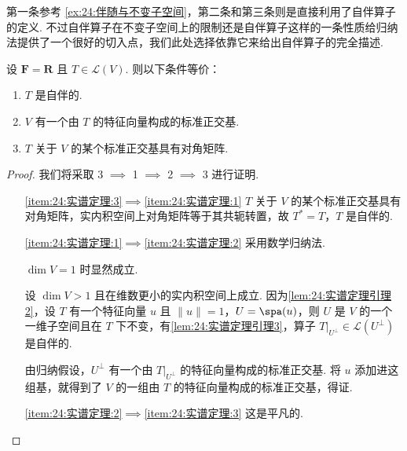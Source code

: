 第一条参考 \autoref{ex:24:伴随与不变子空间}，第二条和第三条则是直接利用了自伴算子的定义. 不过自伴算子在不变子空间上的限制还是自伴算子这样的一条性质给归纳法提供了一个很好的切入点，我们此处选择依靠它来给出自伴算子的完全描述.

\begin{theorem}[实谱定理] \label{thm:24:实谱定理} 
    设 $ \mathbf{F} = \mathbf{R} $ 且 $ T \in \mathcal{L}(V) $. 则以下条件等价：
    \begin{enumerate}
        \item \label{item:24:实谱定理:1}
              $ T $ 是自伴的.

        \item \label{item:24:实谱定理:2}
              $ V $ 有一个由 $ T $ 的特征向量构成的标准正交基.

        \item \label{item:24:实谱定理:3}
              $ T $ 关于 $ V $ 的某个标准正交基具有对角矩阵.
    \end{enumerate}
\end{theorem}

\begin{proof}
    我们将采取 3 $\implies$ 1 $\implies$ 2 $\implies$ 3 进行证明.

    \begin{itemize}
        \item[\ref*{item:24:实谱定理:3}$\implies$\ref*{item:24:实谱定理:1}] $ T $ 关于 $ V $ 的某个标准正交基具有对角矩阵，实内积空间上对角矩阵等于其共轭转置，故 $ T^* = T $，$ T $ 是自伴的.

        \item[\ref*{item:24:实谱定理:1}$\implies$\ref*{item:24:实谱定理:2}] 采用数学归纳法.

            $ \dim V = 1 $ 时显然成立.

            设 $ \dim V > 1 $ 且在维数更小的实内积空间上成立. 因为\autoref{lem:24:实谱定理引理2}，设 $ T $ 有一个特征向量 $ u $ 且 $ \lVert u \rVert = 1 $，$ U = \spa(u) $，则 $ U $ 是 $ V $ 的一个一维子空间且在 $ T $ 下不变，有\autoref{lem:24:实谱定理引理3}，算子 $ T|_{U^{\perp }} \in \mathcal{L}(U^{\perp }) $ 是自伴的.

            由归纳假设，$ U^{\perp } $ 有一个由 $ T|_{U^{\perp }} $ 的特征向量构成的标准正交基. 将 $ u $ 添加进这组基，就得到了 $ V $ 的一组由 $ T $ 的特征向量构成的标准正交基，得证.

        \item[\ref*{item:24:实谱定理:2}$\implies$\ref*{item:24:实谱定理:3}] 这是平凡的.
    \end{itemize}
\end{proof}


